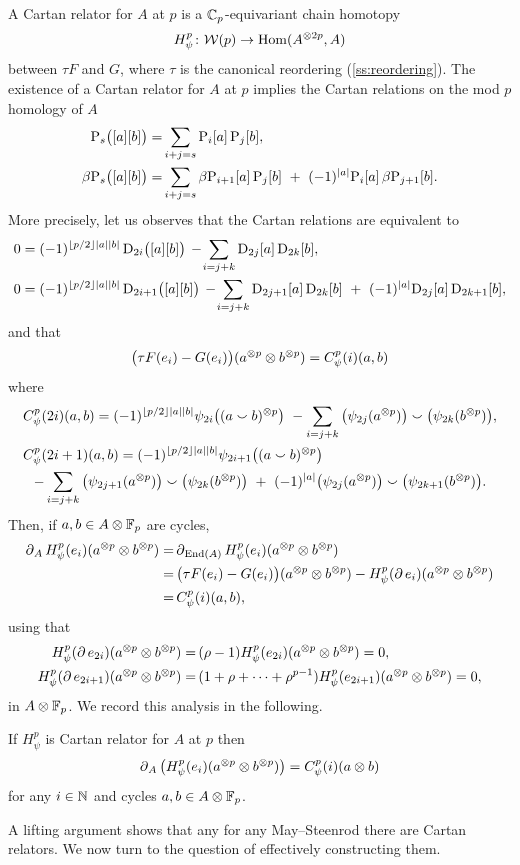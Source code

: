 A Cartan relator for $A$ at $p$ is a $\mathbb{C}_p$-equivariant chain homotopy
\[
H_\psi^p \colon \mathcal{W}(p) \to \mathrm{Hom}(A^{\otimes 2p}, A)
\]
between $\tau F$ and $G$, where $\tau$ is the canonical reordering (\cref{ss:reordering}).
The existence of a Cartan relator for $A$ at $p$ implies the Cartan relations on the mod $p$ homology of $A$
\begin{align*}
	\mathrm{P}_s\big([a][b]\big) =&
	\sum_{i+j=s} \mathrm{P}_i[a] \, \mathrm{P}_j[b], \\
	\beta\mathrm{P}_s\big([a][b]\big) =&
	\sum_{i+j=s} \beta\mathrm{P}_{i+1}[a] \, \mathrm{P}_j[b] \ +\ (-1)^{\lvert a\rvert} \mathrm{P}_i[a] \, \beta\mathrm{P}_{j+1}[b].
\end{align*}
More precisely, let us observes that the Cartan relations are equivalent to
\begin{align*}
	0 &= (-1)^{\floor{p/2}\bars{a}\bars{b}} \, \rD_{2i}\big([a][b]\big) \,-\!
	\sum_{i=j+k} \rD_{2j}[a] \, \rD_{2k}[b], \\
	0 &= (-1)^{\floor{p/2}\bars{a}\bars{b}} \, \rD_{2i+1}\big([a][b]\big) \,-\!
	\sum_{i=j+k} \rD_{2j+1}[a] \, \rD_{2k}[b] \ +\ (-1)^{\bars{a}}\rD_{2j}[a] \, \rD_{2k+1}[b],
\end{align*}
and that
\[
\big(\tau F(e_i) - G(e_i)\big)(a^{\otimes p} \otimes b^{\otimes p}) = C^p_\psi(i)(a,b)
\]
where
\begin{multline*}
	C_\psi^p(2i)(a,b) = (-1)^{\floor{p/2}\bars{a}\bars{b}} \psi_{2i}\big((a \smallsmile b)^{\ot p}\big) \ -
	\sum_{i=j+k}\big(\psi_{2j}(a^{\ot p})\big) \smallsmile \big(\psi_{2k}(b^{\ot p})\big), \hfill \\
	C_\psi^p(2i+1)(a,b) = (-1)^{\floor{p/2}\bars{a}\bars{b}} \psi_{2i+1}\big((a \smallsmile b)^{\ot p}\big) \hfill \\ -
	\sum_{i=j+k} \big(\psi_{2j+1}(a^{\ot p})\big) \smallsmile \big(\psi_{2k}(b^{\ot p})\big)\ +\
	(-1)^{\bars{a}}\big(\psi_{2j}(a^{\ot p})\big) \smallsmile \big(\psi_{2k+1}(b^{\ot p})\big).
\end{multline*}
Then, if $a,b \in A \otimes {\mathbb{F}_p}$ are cycles,
\begin{align*}
	\operatorname{\partial}_A H_\psi^p(e_i)(a^{\otimes p} \otimes b^{\otimes p}) =&
	\operatorname{\partial}_{\mathrm{End}(A)} H_\psi^p(e_i)(a^{\otimes p} \otimes b^{\otimes p}) \\ =& \,
	\big(\tau F(e_i) - G(e_i)\big)(a^{\otimes p} \otimes b^{\otimes p}) -
	H_\psi^p(\operatorname{\partial} e_i)(a^{\otimes p} \otimes b^{\otimes p}) \\ =&\,
	C^p_\psi(i)(a,b),
\end{align*}
using that
\begin{align*}
	H_\psi^p(\operatorname{\partial} e_{2i})(a^{\otimes p} \otimes b^{\otimes p}) =&\,
	(\rho - 1) H_\psi^p(e_{2i})(a^{\otimes p} \otimes b^{\otimes p}) = 0, \\
	H_\psi^p(\operatorname{\partial} e_{2i+1})(a^{\otimes p} \otimes b^{\otimes p}) =&\,
	(1+\rho+\dots+\rho^{p-1}) H_\psi^p(e_{2i+1})(a^{\otimes p} \otimes b^{\otimes p}) = 0,
\end{align*}
in $A \otimes {\mathbb{F}_p}$.
We record this analysis in the following.
\begin{theorem*}
	If $H_\psi^p$ is Cartan relator for $A$ at $p$ then
	\[
	\operatorname{\partial}_A \big(H_\psi^p(e_i)(a^{\otimes p} \otimes b^{\otimes p})\big) = C_\psi^p(i)(a \otimes b)
	\]
	for any $i \in \mathbb{N}$ and cycles $a,b \in A \otimes {\mathbb{F}_p}$.
\end{theorem*}

A lifting argument shows that any for any May--Steenrod there are Cartan relators.
We now turn to the question of effectively constructing them.